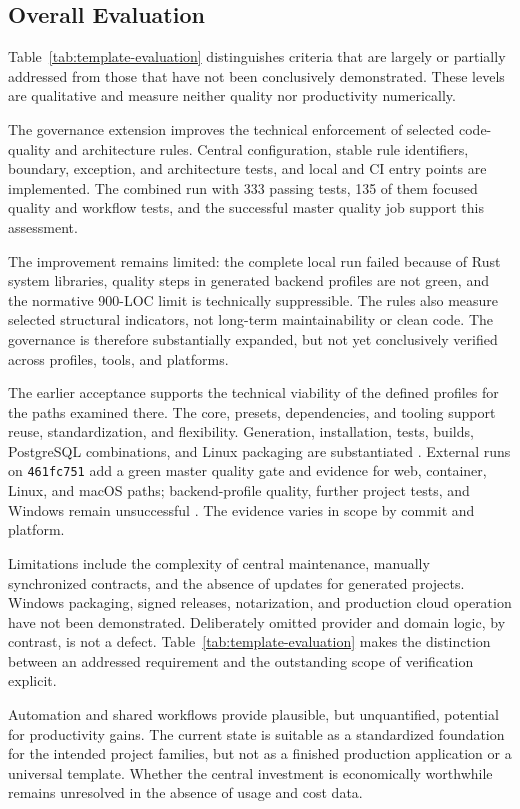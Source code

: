\subsection{Overall Evaluation}
\label{subsec:gesamtbewertung}

Table~\ref{tab:template-evaluation} distinguishes criteria that are largely or
partially addressed from those that have not been conclusively demonstrated.
These levels are qualitative and measure neither quality nor productivity
numerically.



The governance extension improves the technical enforcement of selected code-
quality and architecture rules. Central configuration, stable rule
identifiers, boundary, exception, and architecture tests, and local and CI
entry points are implemented. The combined run with 333 passing tests, 135 of
them focused quality and workflow tests, and the successful master quality job
support this assessment.

The improvement remains limited: the complete local run failed because of
Rust system libraries, quality steps in generated backend profiles are not
green, and the normative 900-LOC limit is technically suppressible. The rules
also measure selected structural indicators, not long-term maintainability or
clean code. The governance is therefore substantially expanded, but not yet
conclusively verified across profiles, tools, and platforms.

The earlier acceptance supports the technical viability of the defined
profiles for the paths examined there. The core, presets, dependencies, and
tooling support reuse, standardization, and flexibility. Generation,
installation, tests, builds, PostgreSQL combinations, and Linux packaging are
substantiated \parencite{kleiveist2026acceptance}. External runs on
\texttt{461fc751} add a green master quality gate and evidence for web,
container, Linux, and macOS paths; backend-profile quality, further project
tests, and Windows remain unsuccessful
\parencite{kleiveist2026governance-core-run,kleiveist2026governance-profiles-run,kleiveist2026governance-desktop-run}.
The evidence varies in scope by commit and platform.

Limitations include the complexity of central maintenance, manually
synchronized contracts, and the absence of updates for generated projects.
Windows packaging, signed releases, notarization, and production cloud
operation have not been demonstrated. Deliberately omitted provider and domain
logic, by contrast, is not a defect.
Table~\ref{tab:template-evaluation} makes the distinction between an addressed
requirement and the outstanding scope of verification explicit.

Automation and shared workflows provide plausible, but unquantified, potential
for productivity gains. The current state is suitable as a standardized
foundation for the intended project families, but not as a finished production
application or a universal template.
Whether the central investment is economically worthwhile remains unresolved
in the absence of usage and cost data.
